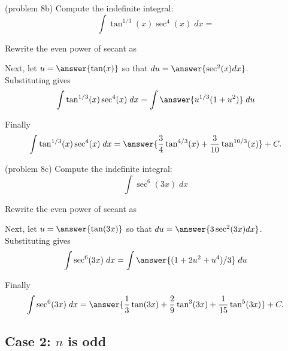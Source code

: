 \documentclass[handout]{ximera}
\begin{document}
\begin{problem}(problem 8b)
Compute the indefinite integral:
\[
\int \tan^{1/3}(x) \sec^4(x)\;dx = 
\]

Rewrite the even power of secant as

\begin{multipleChoice}
\end{multipleChoice}

Next, let $u = \answer{\tan(x)}$ so that $du = \answer{\sec^2(x) dx}$.\\

Substituting gives 
\[
\int \tan^{1/3}(x)\sec^4(x) \; dx= \int \answer{u^{1/3}(1+u^2)} \; du
\]

Finally 
\[
\int \tan^{1/3}(x)\sec^4(x) \; dx= \answer{\frac34 \tan^{4/3}(x) + \frac{3}{10} \tan^{10/3}(x)} + C.
\]

\end{problem}

\begin{problem}(problem 8c)
Compute the indefinite integral:
\[
\int  \sec^6(3x)\;dx
\]

Rewrite the even power of secant as

\begin{multipleChoice}
\end{multipleChoice}

Next, let $u = \answer{\tan(3x)}$ so that $du = \answer{3\sec^2(3x) dx}$.\\

Substituting gives 
\[
\int \sec^6(3x) \; dx= \int \answer{(1+ 2u^2 +u^4)/3} \; du
\]

Finally 
\[
\int \sec^6(3x) \; dx= \answer{\frac13 \tan(3x) + \frac29 \tan^3(3x) + \frac{1}{15}\tan^5(3x)} + C.
\]


\end{problem}




\subsection{Case 2: $n$ is odd}
\end{document}
